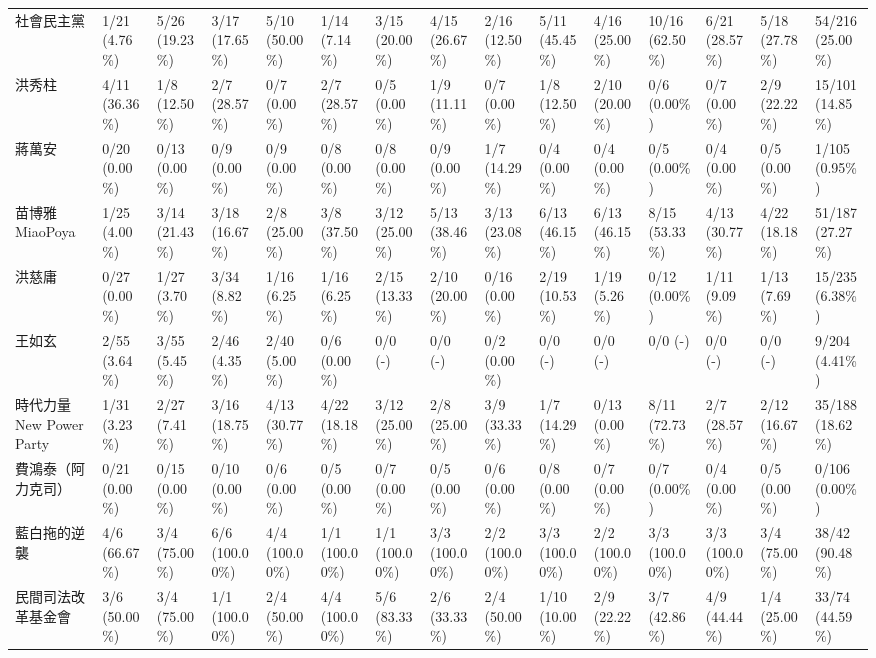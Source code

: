 \documentclass[a4paper, 10pt, conference]{ieeeconf}       %
\begin{document}
\begin{CJK}{UTF8}{bsmi}
\begin{landscape}
\begin{longtable}[c]{@{}L{2.45cm}L{1.1cm}L{1.1cm}L{1.1cm}L{1.1cm}L{1.1cm}L{1.1cm}L{1.1cm}L{1.1cm}L{1.1cm}L{1.1cm}L{1.1cm}L{1.1cm}L{1.1cm}L{1.1cm}@{}}
社會民主黨 & 1/21 (4.76\%) & 5/26 (19.23\%) & 3/17 (17.65\%) & 5/10 (50.00\%) & 1/14 (7.14\%) & 3/15 (20.00\%) & 4/15 (26.67\%) & 2/16 (12.50\%) & 5/11 (45.45\%) & 4/16 (25.00\%) & 10/16 (62.50\%) & 6/21 (28.57\%) & 5/18 (27.78\%) & 54/216 (25.00\%) \\
洪秀柱 & 4/11 (36.36\%) & 1/8 (12.50\%) & 2/7 (28.57\%) & 0/7 (0.00\%) & 2/7 (28.57\%) & 0/5 (0.00\%) & 1/9 (11.11\%) & 0/7 (0.00\%) & 1/8 (12.50\%) & 2/10 (20.00\%) & 0/6 (0.00\%) & 0/7 (0.00\%) & 2/9 (22.22\%) & 15/101 (14.85\%) \\
蔣萬安 & 0/20 (0.00\%) & 0/13 (0.00\%) & 0/9 (0.00\%) & 0/9 (0.00\%) & 0/8 (0.00\%) & 0/8 (0.00\%) & 0/9 (0.00\%) & 1/7 (14.29\%) & 0/4 (0.00\%) & 0/4 (0.00\%) & 0/5 (0.00\%) & 0/4 (0.00\%) & 0/5 (0.00\%) & 1/105 (0.95\%) \\
苗博雅 MiaoPoya & 1/25 (4.00\%) & 3/14 (21.43\%) & 3/18 (16.67\%) & 2/8 (25.00\%) & 3/8 (37.50\%) & 3/12 (25.00\%) & 5/13 (38.46\%) & 3/13 (23.08\%) & 6/13 (46.15\%) & 6/13 (46.15\%) & 8/15 (53.33\%) & 4/13 (30.77\%) & 4/22 (18.18\%) & 51/187 (27.27\%) \\
洪慈庸 & 0/27 (0.00\%) & 1/27 (3.70\%) & 3/34 (8.82\%) & 1/16 (6.25\%) & 1/16 (6.25\%) & 2/15 (13.33\%) & 2/10 (20.00\%) & 0/16 (0.00\%) & 2/19 (10.53\%) & 1/19 (5.26\%) & 0/12 (0.00\%) & 1/11 (9.09\%) & 1/13 (7.69\%) & 15/235 (6.38\%) \\
王如玄 & 2/55 (3.64\%) & 3/55 (5.45\%) & 2/46 (4.35\%) & 2/40 (5.00\%) & 0/6 (0.00\%) & 0/0 (-) & 0/0 (-) & 0/2 (0.00\%) & 0/0 (-) & 0/0 (-) & 0/0 (-) & 0/0 (-) & 0/0 \newline (-) & 9/204 (4.41\%) \\
時代力量 New Power Party & 1/31 (3.23\%) & 2/27 (7.41\%) & 3/16 (18.75\%) & 4/13 (30.77\%) & 4/22 (18.18\%) & 3/12 (25.00\%) & 2/8 (25.00\%) & 3/9 (33.33\%) & 1/7 (14.29\%) & 0/13 (0.00\%) & 8/11 (72.73\%) & 2/7 (28.57\%) & 2/12 (16.67\%) & 35/188 (18.62\%) \\
費鴻泰（阿力克司） & 0/21 (0.00\%) & 0/15 (0.00\%) & 0/10 (0.00\%) & 0/6 (0.00\%) & 0/5 (0.00\%) & 0/7 (0.00\%) & 0/5 (0.00\%) & 0/6 (0.00\%) & 0/8 (0.00\%) & 0/7 (0.00\%) & 0/7 (0.00\%) & 0/4 (0.00\%) & 0/5 (0.00\%) & 0/106 (0.00\%) \\
藍白拖的逆襲 & 4/6 (66.67\%) & 3/4 (75.00\%) & 6/6 (100.00\%) & 4/4 (100.00\%) & 1/1 (100.00\%) & 1/1 (100.00\%) & 3/3 (100.00\%) & 2/2 (100.00\%) & 3/3 (100.00\%) & 2/2 (100.00\%) & 3/3 (100.00\%) & 3/3 (100.00\%) & 3/4 (75.00\%) & 38/42 (90.48\%) \\
民間司法改革基金會 & 3/6 (50.00\%) & 3/4 (75.00\%) & 1/1 (100.00\%) & 2/4 (50.00\%) & 4/4 (100.00\%) & 5/6 (83.33\%) & 2/6 (33.33\%) & 2/4 (50.00\%) & 1/10 (10.00\%) & 2/9 (22.22\%) & 3/7 (42.86\%) & 4/9 (44.44\%) & 1/4 (25.00\%) & 33/74 (44.59\%) \\

\end{longtable}
\end{landscape}
\end{CJK}
\end{document}

